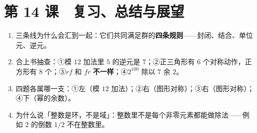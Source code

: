 \section*{第 14 课　复习、总结与展望}
\begin{enumerate}
  \item 三条线为什么会汇到一起：它们共同满足群的\textbf{四条规则}——封闭、结合、单位元、逆元。
  \item 合上书抽查：①模 \(12\) 加法里 \(5\) 的逆元是 \(7\)；②正三角形有 \(6\) 个对称动作，正方形有 \(8\) 个；③\(rf\) 和 \(fr\) \textbf{不一样}；④\(2^{100}\) 除以 \(7\) 余 \(2\)。
  \item 四题各属哪一支：①左（模 \(12\) 加法）；②右（图形对称）；③右（图形对称）；④下（幂的余数）。
  \item 为什么说「整数是环，不是域」：整数里不是每个非零元素都能做除法——例如 \(2\) 的倒数 \(1/2\) 不在整数里。
\end{enumerate}

